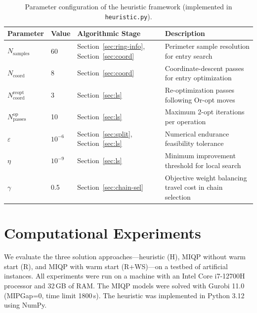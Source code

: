 \documentclass[12pt]{elsarticle}
\begin{document}
\begin{table}[t]
	\centering
	\caption{Parameter configuration of the heuristic framework (implemented in \texttt{heuristic.py}).}
	\label{tab:heuristic-params}
	\begin{tabular}{llll}
		\toprule
		\textbf{Parameter} & \textbf{Value} & \textbf{Algorithmic Stage} & \textbf{Description} \\
		\midrule
		$N_{\text{samples}}$ & 60 & Section~\ref{sec:ring-info}, Section~\ref{sec:coord} & Perimeter sample resolution for entry search \\
		$N_{\text{coord}}$ & 8 & Section~\ref{sec:coord} & Coordinate-descent passes for entry optimization \\
		$N_{\text{coord}}^{\text{reopt}}$ & 3 & Section~\ref{sec:ls} & Re-optimization passes following Or-opt moves \\
		$N_{\text{passes}}^{\text{op}}$ & 10 & Section~\ref{sec:ls} & Maximum 2-opt iterations per operation \\
		$\varepsilon$ & $10^{-6}$ & Section~\ref{sec:split}, Section~\ref{sec:ls} & Numerical endurance feasibility tolerance \\
		$\eta$ & $10^{-9}$ & Section~\ref{sec:ls} & Minimum improvement threshold for local search \\
		$\gamma$ & 0.5 & Section~\ref{sec:chain-sel} & Objective weight balancing travel cost in chain selection \\
		\bottomrule
	\end{tabular}
\end{table}


\section{Computational Experiments}
\label{sec:experiments}

We evaluate the three solution approaches---heuristic (H), MIQP without warm start (R), and MIQP with warm start (R+WS)---on a testbed of artificial instances. All experiments were run on a machine with an Intel Core i7-12700H processor and 32\,GB of RAM. The MIQP models were solved with Gurobi 11.0 (MIPGap=0, time limit 1800\,s). The heuristic was implemented in Python 3.12 using NumPy.
\end{document}
